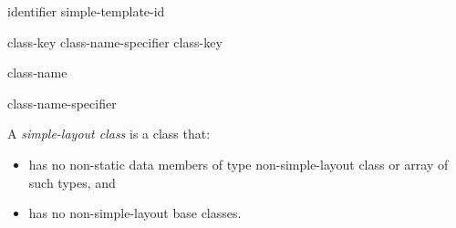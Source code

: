 
\begin{grammar}
  \br
  identifier\br
  simple-template-id\br

  \br
  class-key class-name-specifier \br
  class-key \br

  \br
   class-name\br

  \br
  \terminal{:} class-name-specifier\br

  \br
  \br
\end{grammar}


\p A \textit{simple-layout class} is a class that:
\begin{itemize}
  \item has no non-static data members of type non-simple-layout class or array
  of such types, and
  \item has no non-simple-layout base classes.
\end{itemize}
